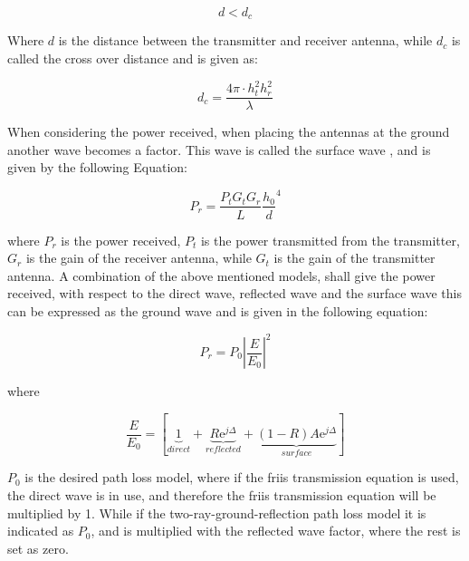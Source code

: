 


\begin{equation}
d < d_{c}
\label{two_ray_cond}
\end{equation}

Where $d$ is the distance between the transmitter and receiver antenna, while $d_{c}$ is called the cross over distance and is given as:

\begin{equation}
d_{c} = \frac{4\pi \cdot h^2_t h^2_r }{\lambda}
\label{two_ray_cross_dis}
\end{equation}  

When considering the power received, when placing the antennas at the ground another wave becomes a factor. This wave is called the surface wave \cite{Chong}, and is given by the following Equation:

\begin{equation}
P_r=\frac{P_t G_t G_r }{L}\frac{h_0}{d}^4
\label{surface_wave}
\end{equation}

where $P_{r}$ is the power received, $P_{t}$ is the power transmitted from the transmitter, $G_{r}$ is the gain of the receiver antenna, while $G_{t}$ is the gain of the transmitter antenna. A combination of the above mentioned models, shall give the power received, with respect to the direct wave, reflected wave and the surface wave this can be expressed as the ground wave \cite{Chong} and is given in the following equation:


\begin{equation}
P_r=P_0 \left|\frac{E}{E_0}\right|^2 
\label{ground_wave}
\end{equation}

where

\begin{equation}
\frac{E}{E_{0}}=[\underbrace{1}_{direct}+\underbrace{R\text{e}^{j\Delta}}_{reflected}+\underbrace{(1-R)A\text{e}^{j\Delta}}_{surface}]
\end{equation}

$P_{0}$ is the desired path loss model, where if the friis transmission equation is used, the direct wave is in use, and therefore the friis transmission equation will be multiplied by 1. While if the two-ray-ground-reflection path loss model it is indicated as $P_{0}$, and is multiplied with the reflected wave factor, where the rest is set as zero. 




